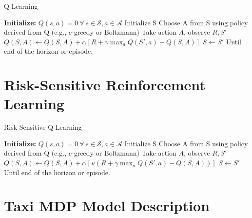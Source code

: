 \documentclass{article}
\newcommand{\mc}{\mathcal}
\begin{document}
\begin{algorithm}[H]
\caption{Q-Learning}
\begin{spacing}{0.8}
\begin{algorithmic}[1]
\State \textbf{Initialize:} $Q(s, a) = 0 \ \forall \ s \in \mc{S}, a \in \mc{A}$
\State Initialize S
\State Choose A from S using policy derived from Q (e.g., $e$-greedy or Boltzmann)
\State Take action $A$, observe $R, S'$
\State $Q(S, A) \gets Q(S, A) + \alpha[R + \gamma \max_a Q(S', a) - Q(S, A)]$
\State $S \gets S'$
\EndFor
\State Until end of the horizon or episode.
\EndFor
\EndProcedure
\end{algorithmic}
\end{spacing}
\end{algorithm}

\section{Risk-Sensitive Reinforcement Learning}\label{sec:risk_appendix}
\begin{algorithm}[H]
\caption{Risk-Sensitive Q-Learning}
\begin{spacing}{0.8}
\begin{algorithmic}[1]
\State \textbf{Initialize:} $Q(s, a) = 0 \ \forall \ s \in \mc{S}, a \in \mc{A}$
\State Initialize S
\State Choose A from S using policy derived from Q (e.g., $e$-greedy or Boltzmann)
\State Take action $A$, observe $R, S'$
\State $Q(S, A) \gets Q(S, A) + \alpha[u(R + \gamma \max_a Q(S', a) - Q(S, A))]$
\State $S \gets S'$
\EndFor
\State Until end of the horizon or episode.
\EndFor
\EndProcedure
\end{algorithmic}
\end{spacing}
\end{algorithm}


\section{Taxi MDP Model Description}\label{mdp}
\end{document}
